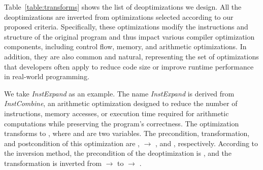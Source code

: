 

Table~\ref{table:transforms} shows the list of deoptimizations we design. All the deoptimizations are inverted from optimizations selected according to our proposed criteria. Specifically, these optimizations modify the instructions and structure of the original program and thus impact various compiler optimization components, including control flow, memory, and arithmetic optimizations. In addition, they are also common and natural, representing the set of optimizations that developers often apply to reduce code size or improve runtime performance in real-world programming.

We take \textit{InstExpand} as an example. The name \textit{InstExpand} is derived from \textit{InstCombine}, an arithmetic optimization designed to reduce the number of instructions, memory accesses, or execution time required for arithmetic computations while preserving the program's correctness. 
The optimization transforms  to , where  and  are two variables. The precondition, transformation, and postcondition of this optimization are ,  $\rightarrow$ , and , respectively. According to the inversion method, the precondition of the deoptimization is , and the transformation is inverted from  $\rightarrow$  to  $\rightarrow$ .

